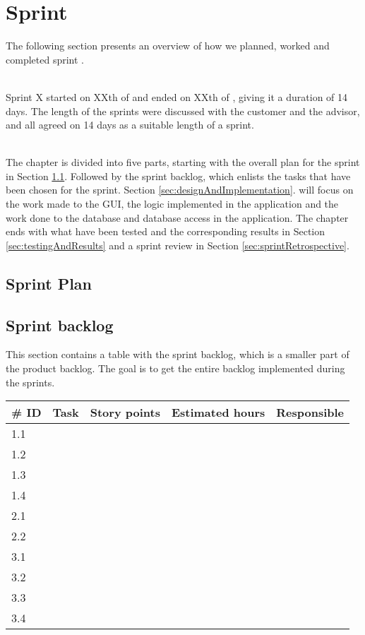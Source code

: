 \section{Sprint }


The following section presents an overview of how we planned, worked and
completed sprint .

\\
Sprint X started on XXth of  and ended on XXth of , giving it a duration of 14 days. The length of the sprints were discussed with the customer and the advisor, and all agreed on 14 days as a suitable length of a sprint.

\\
The chapter is divided into five parts, starting with the overall plan for the
sprint in Section \ref{sec:sprintplan}. Followed by the sprint backlog, which
enlists the tasks that have been chosen for the sprint. Section
\ref{sec:designAndImplementation}.
will focus on the work made to the GUI, the logic implemented in the application and the work done to the database and database access in the application.
The chapter ends with what have been tested and the corresponding results in
Section \ref{sec:testingAndResults} and a sprint review in Section
\ref{sec:sprintRetrospective}.

\subsection{Sprint Plan}
\label{sec:sprintplan}



\subsection{Sprint backlog}
This section contains a table with the sprint backlog, which is a smaller part of the product backlog. The goal is to get the entire backlog implemented during the sprints.

\begin{table}[h]
\begin{center}
\begin{tabular}{|p{2.0cm}| p{5.0cm}| p{2.0cm}|p{2.0cm}|p{2.0cm}|}
\hline
\#  ID 	& Task 	& Story points 	& Estimated hours & Responsible \\
\hline
1.1 & & & & \\
\hline
1.2 & & & & \\
\hline
1.3 & & &  & \\
\hline
1.4 & & & & \\
\hline
2.1 & & &  & \\
\hline
2.2 & & & & \\
\hline
3.1 & & & & \\
\hline
3.2 & & & & \\
\hline
3.3 & & & & \\
\hline
3.4 & &  & &  \\
\hline
\end{tabular}
\end{center}
\end{table}





